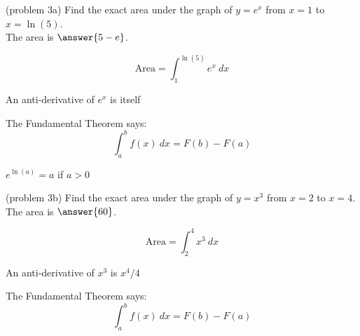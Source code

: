 \documentclass[handout]{ximera}
\begin{document}
\begin{problem}(problem 3a)
 Find the exact area under the graph of $y = e^x$ from $x=1$ to $x = \ln(5)$.\\
The area is $\answer{5-e}$.
 \begin{hint}
 \[
 \text{Area} = \int_1^{\ln(5)} e^x \ dx 
  \]
  \end{hint}
    \begin{hint}
      An anti-derivative of $e^x$ is itself
    \end{hint}
    
    \begin{hint}
      The Fundamental Theorem says:
      \[
      \int_a^b f(x) \ dx = F(b) - F(a)
      \]
    \end{hint}   
		\begin{hint}
      $e^{\ln(a)} = a$ if $a > 0$
    \end{hint}
\end{problem}




\begin{problem}(problem 3b)
Find the exact area under the graph of $y = x^3$ from $x = 2$ to $x = 4$.\\
The area is $\answer{60}$.
 \begin{hint}
 \[
  \text{Area}=\int_2^{4} x^3 \ dx
  \]
  \end{hint}
    \begin{hint}
      An anti-derivative of $x^3$ is $x^4 /4$
    \end{hint}
    \begin{hint}
      The Fundamental Theorem says:
      \[
      \int_a^b f(x) \ dx = F(b) - F(a)
      \]
    \end{hint}    
		
		
\end{problem}
\end{document}
